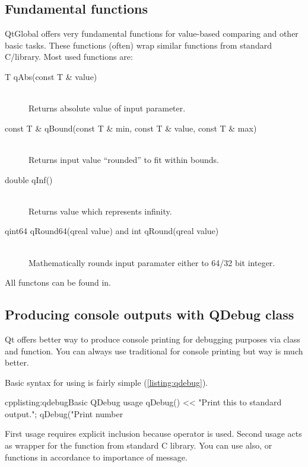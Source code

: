 \subsection{Fundamental functions}
QtGlobal offers very fundamental functions for value-based comparing and other basic tasks. These functions (often) wrap similar functions from standard C/\cpp library. Most used functions are:
\begin{description}
\item[T qAbs(const T \& value)] \hfill \\
Returns absolute value of input parameter.
\item[const T \& qBound(const T \& min, const T \& value, const T \& max)] \hfill \\
Returns input value \enquote{rounded} to fit within bounds.
\item[double qInf()] \hfill \\
Returns value which represents infinity.
\item[qint64 qRound64(qreal value) and int qRound(qreal value)] \hfill \\
Mathematically rounds input paramater either to 64/32 bit integer.
\end{description}

All functons can be found in.

\subsection{Producing console outputs with QDebug class}
Qt offers better way to produce console printing for debugging purposes via  class and function. You can always use traditional for console printing but way is much better.

Basic syntax for using is fairly simple (\autoref{listing:qdebug}).

\begin{fdoccode}{cpp}{listing:qdebug}{Basic QDebug usage}
qDebug() << "Print this to standard output.";
qDebug("Print number %
\end{fdoccode}

First usage requires explicit inclusion because operator is used. Second usage acts as wrapper for the function from standard C library. You can use also, or functions in accordance to importance of message.

